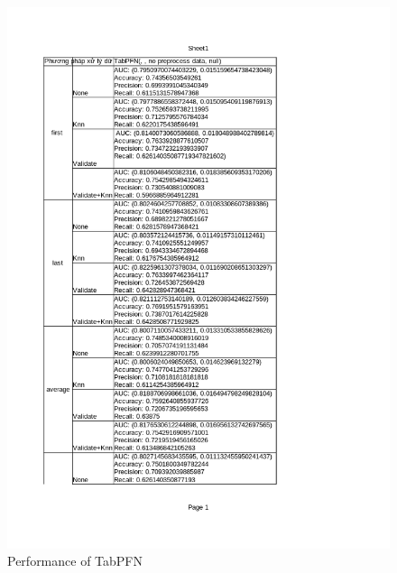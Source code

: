 \documentclass[../main.tex]{subfiles}
\begin{document}
 \begin{figure}[H]
    \centering
    \includegraphics[width=\textwidth]{Figure/KidneyResultLimit_TabPFN.png}
    \caption{Performance of TabPFN}
    \label{fig:KidneyResultLimit_TabPFN}
\end{figure}
\end{document}
